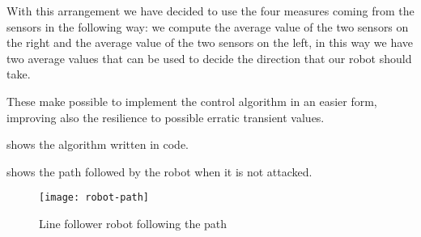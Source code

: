 With this arrangement we have decided to use the four measures coming from the
sensors in the following way: we compute the average value of the two sensors on
the right and the average value of the two sensors on the left, in this way we
have two average values that can be used to decide the direction that our robot
should take.

These make possible to implement the control algorithm in an easier form,
improving also the resilience to possible erratic transient values.

 shows the algorithm written in  code.



 shows the path followed by the robot when it is not
attacked.

\begin{figure}[htb]
	\centering
	\texttt{[image: robot-path]}
	\caption{Line follower robot following the path}\label{fig:robotpath}
\end{figure}
